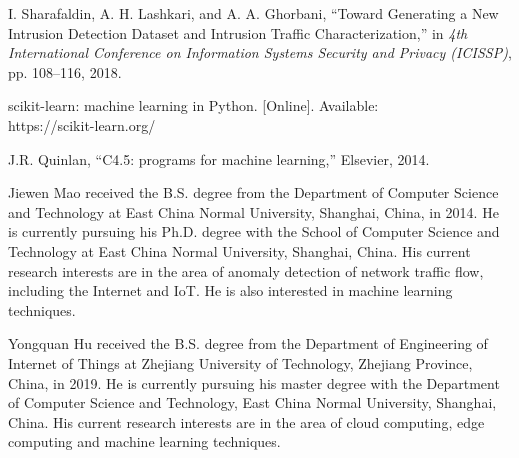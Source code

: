 \documentclass{ieeeaccess}
\theoremstyle{definition}
\begin{document}
\begin{thebibliography}{00}
    I. Sharafaldin, A. H. Lashkari, and A. A. Ghorbani, ``Toward Generating a New Intrusion Detection Dataset and Intrusion Traffic Characterization,'' in \emph{4th International Conference on Information Systems Security and Privacy (ICISSP)}, pp. 108--116, 2018.

    scikit-learn: machine learning in Python. [Online]. Available: \\ https://scikit-learn.org/

    J.R. Quinlan, ``C4.5: programs for machine learning,'' Elsevier, 2014.
\end{thebibliography}

\begin{IEEEbiography}{Jiewen Mao}
    received the B.S. degree from the Department of Computer Science and Technology at East China Normal University, Shanghai, China, in 2014. He is currently pursuing his Ph.D. degree with the School of Computer Science and Technology at East China Normal University, Shanghai, China. His current research interests are in the area of anomaly detection of network traffic flow, including the Internet and IoT. He is also interested in machine learning techniques.
\end{IEEEbiography}

\begin{IEEEbiography}{Yongquan Hu}
    received the B.S. degree from the Department of Engineering of Internet of Things at Zhejiang University of Technology, Zhejiang Province, China, in 2019. He is currently pursuing his master degree with the Department of Computer Science and Technology, East China Normal University, Shanghai, China. His current research interests are in the area of cloud computing, edge computing and machine learning techniques.
\end{IEEEbiography}
\end{document}
